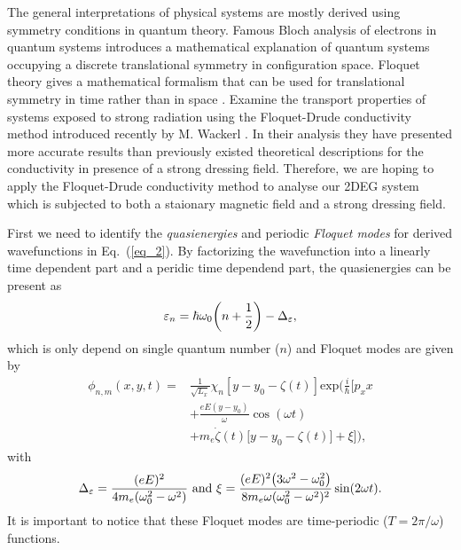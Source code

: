 
The general interpretations of physical systems are mostly derived using symmetry conditions in quantum theory. Famous Bloch analysis of electrons in quantum systems introduces a mathematical explanation of quantum systems occupying a discrete translational symmetry in configuration space. Floquet theory gives a mathematical formalism that can be used for translational symmetry in time rather than in space \cite{floquet83,grifoni98,holthaus15}. Examine the transport properties of systems exposed to strong radiation using the Floquet-Drude conductivity method introduced recently by M. Wackerl \cite{wackerl20}. In their analysis they have presented more accurate results than previously existed theoretical descriptions for the conductivity in presence of a strong dressing field. Therefore, we are hoping to apply the Floquet-Drude conductivity method to analyse our 2DEG system which is subjected to both a staionary magnetic field and a strong dressing field.

First we need to identify the \textit{quasienergies} and periodic \textit{Floquet modes} for derived wavefunctions in Eq.~(\ref{eq_2}). By factorizing the wavefunction into a linearly time dependent part and a peridic time dependend part, the quasienergies can be present as
\begin{equation} \label{eq_6}
  \varepsilon_{n} =
  \hbar \omega_0\qty(n + \frac{1}{2}) - \Delta_{\varepsilon},
\end{equation}
which is only depend on single quantum number ($n$) and Floquet modes are given by
\begin{equation} \label{eq_7}
  \begin{aligned}
    \phi_{n,m}(x,y,t) = &
    \frac{1}{\sqrt{L_x}} \chi_{n}\left[y - y_0 - \zeta(t)\right]
    \text{exp}\bigg(
     \frac{i}{\hbar}\bigg[
     p_x x \\
     & +
     \frac{eE(y - y_0)}{\omega}\cos(\omega t) \\
     & +
     m_e\dot{\zeta}(t)\big[y - y_0 -\zeta(t)\big]
     + \xi \bigg]\bigg),
  \end{aligned}
\end{equation}
with
\begin{equation} \label{eq_8}
  \Delta_{\varepsilon} = \frac{(eE)^2}{4m_e(\omega_0^2 - \omega^2)} ~ \text{and} ~
  \xi = \frac{(eE)^2\qty(3\omega^2 - \omega_0^2)}{8m_e\omega(\omega_0^2 - \omega^2)^2} \sin(2\omega t).
\end{equation}
It is important to notice that these Floquet modes are time-periodic ($T=2\pi/\omega$) functions.

